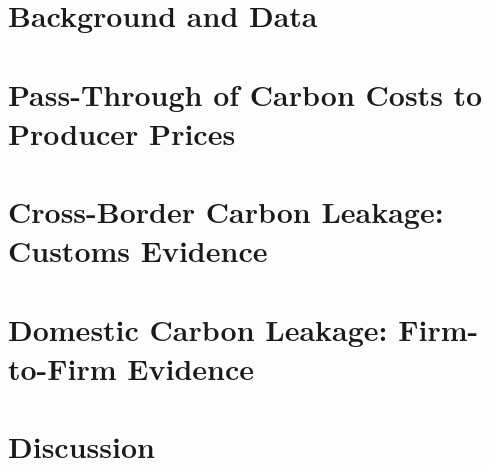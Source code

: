 \documentclass[11pt, reqno]{amsart}
\theoremstyle{definition}
\begin{document}
\section{Background and Data}\label{sec:data}



\section{Pass-Through of Carbon Costs to Producer Prices}\label{sec:passthrough}



\section{Cross-Border Carbon Leakage: Customs Evidence}\label{sec:import_leakage}



\section{Domestic Carbon Leakage: Firm-to-Firm Evidence}\label{sec:b2b_leakage}



\section{Discussion}\label{sec:discussion}



\end{document}
